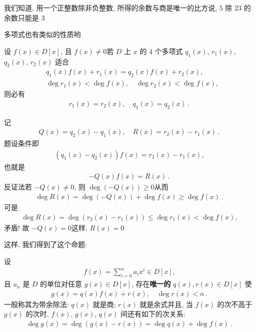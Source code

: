 我们知道, 用一个正整数除非负整数, 所得的余数与商是唯一的\period 比方说, $5$ 除 $23$ 的余数只能是 $3$\period

多项式也有类似的性质哟\period

\begin{proposition}
    设 $f(x) \in D[x]$, 且 $f(x) \neq 0$\period 若 $D$ 上 $x$ 的 $4$ 个多项式 $q_1 (x)$, $r_1 (x)$, $q_2 (x)$, $r_2 (x)$ 适合
    \begin{align*}
         & q_1 (x) f(x) + r_1 (x) = q_2 (x) f(x) + r_2 (x),          \\
         & \deg r_1 (x) < \deg f(x), \quad \deg r_2 (x) < \deg f(x),
    \end{align*}
    则必有
    \begin{align*}
        r_1 (x) = r_2 (x), \quad q_1 (x) = q_2 (x) \period
    \end{align*}
\end{proposition}

\begin{pf}
    记
    \begin{align*}
        Q(x) = q_2 (x) - q_1 (x), \quad R(x) = r_2 (x) - r_1 (x) \period
    \end{align*}
    题设条件即
    \begin{align*}
        (q_1 (x) - q_2 (x)) f(x) = r_2 (x) - r_1 (x),
    \end{align*}
    也就是
    \begin{align*}
        -Q(x) f(x) = R(x) \period
    \end{align*}
    反证法\period 若 $-Q(x) \neq 0$, 则 $\deg (-Q(x)) \geq 0$\period 从而
    \begin{align*}
        \deg R(x) = \deg (-Q(x)) + \deg f(x) \geq \deg f(x) \period
    \end{align*}
    可是
    \begin{align*}
        \deg R(x) = \deg (r_2(x) - r_1(x)) \leq \deg r_1 (x) < \deg f(x),
    \end{align*}
    矛盾! 故 $-Q(x) = 0$\period 这样, $R(x) = 0$\period
\end{pf}

这样, 我们得到了这个命题:

\begin{proposition}
    设
    \begin{align*}
        f(x) = \sum_{i = 0}^{n} a_i x^i \in D[x],
    \end{align*}
    且 $a_n$ 是 $D$ 的单位\period 对任意 $g(x) \in D[x]$, 存在\textbf{唯一的} $q(x), r(x) \in D[x]$ 使
    \begin{align*}
        g(x) = q(x) f(x) + r(x), \quad \deg r(x) < n \period
    \end{align*}
    一般称其为带余除法: $q(x)$ 就是商; $r(x)$ 就是余式\period 并且, 当 $f(x)$ 的次不高于 $g(x)$ 的次时, $f(x)$, $g(x)$, $q(x)$ 间还有如下的次关系:
    \begin{align*}
        \deg g(x) = \deg (g(x) - r(x)) = \deg q(x) + \deg f(x) \period
    \end{align*}
\end{proposition}

